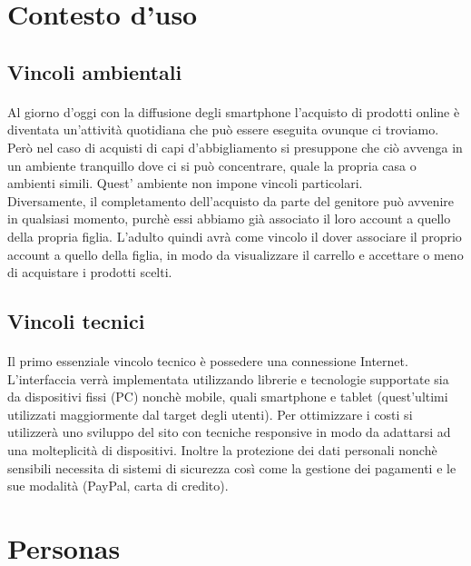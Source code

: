 \documentclass[12pt,a4paper]{report}
\begin{document}
\section{Contesto d'uso}
\subsection{Vincoli ambientali}
\paragraph{}Al giorno d'oggi con la diffusione degli smartphone l'acquisto di prodotti online è diventata un'attività quotidiana che può essere eseguita ovunque ci troviamo. Però nel caso di acquisti di capi d'abbigliamento si presuppone che ciò avvenga in un ambiente tranquillo dove ci si può concentrare, quale la propria casa o ambienti simili. Quest' ambiente non impone vincoli particolari.\\
Diversamente, il completamento dell'acquisto da parte del genitore può avvenire in qualsiasi momento, purchè essi abbiamo già associato il loro account a quello della propria figlia. L'adulto quindi avrà come vincolo il dover associare il proprio account a quello della figlia, in modo da visualizzare il carrello e accettare o meno di acquistare i prodotti scelti.
\subsection{Vincoli tecnici}
\paragraph{}Il primo essenziale vincolo tecnico è possedere una connessione Internet. L'interfaccia verrà implementata utilizzando librerie e tecnologie supportate sia da dispositivi fissi (PC) nonchè mobile, quali smartphone e tablet (quest'ultimi utilizzati maggiormente dal target degli utenti). Per ottimizzare i costi si utilizzerà uno sviluppo del sito con tecniche responsive in modo da adattarsi ad una molteplicità di dispositivi. Inoltre la protezione dei dati personali nonchè sensibili necessita di sistemi di sicurezza così come la gestione dei pagamenti e le sue modalità (PayPal, carta di credito).
\section{Personas}
\end{document}

